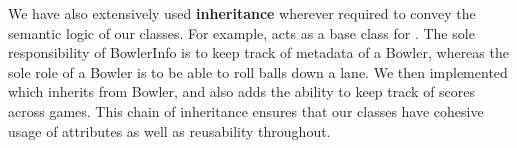 We have also extensively used \textbf{inheritance} wherever required to convey the semantic logic of our classes. For example,  acts as a base class for . The sole responsibility of BowlerInfo is to keep track of metadata of a Bowler, whereas the sole role of a Bowler is to be able to roll balls down a lane. We then implemented  which inherits from Bowler, and also adds the ability to keep track of scores across games. This chain of inheritance ensures that our classes have cohesive usage of attributes as well as reusability throughout.